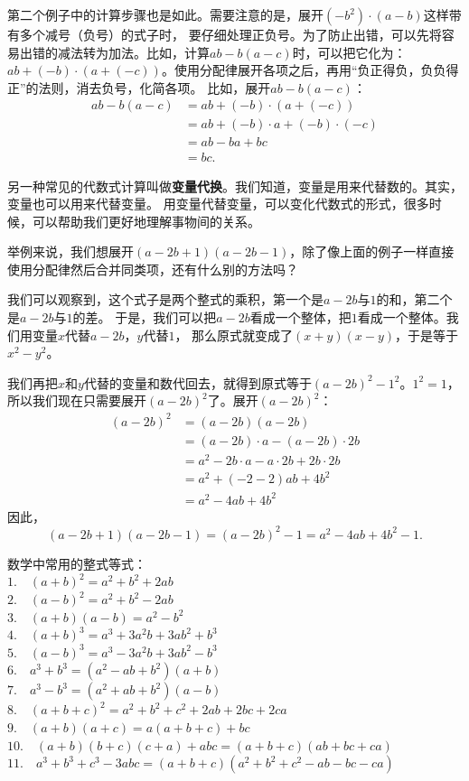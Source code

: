 \documentclass[12pt,UTF8]{ctexbook}
\begin{document}
第二个例子中的计算步骤也是如此。需要注意的是，展开$(- b^2)\cdot (a - b)$这样带有多个减号（负号）的式子时，
要仔细处理正负号。为了防止出错，可以先将容易出错的减法转为加法。比如，计算$ab - b(a-c)$时，可以把它化为：
$ab+(-b)\cdot(a + (-c))$。使用分配律展开各项之后，再用“负正得负，负负得正”的法则，消去负号，化简各项。
比如，展开$ab - b(a-c)$：
\begin{align*}
    ab - b(a-c) &= ab+(-b)\cdot(a + (-c)) \tag{减法化加法}\\
    &= ab + (-b)\cdot a + (-b) \cdot (-c) \tag{分配律展开} \\
    &= ab - ba + bc \tag{消去负号}\\
    &= bc.
\end{align*}

另一种常见的代数式计算叫做\textbf{变量代换}。我们知道，变量是用来代替数的。其实，变量也可以用来代替变量。
用变量代替变量，可以变化代数式的形式，很多时候，可以帮助我们更好地理解事物间的关系。

举例来说，我们想展开$(a - 2b + 1)(a - 2b - 1)$，除了像上面的例子一样直接使用分配律然后合并同类项，还有什么别的方法吗？

我们可以观察到，这个式子是两个整式的乘积，第一个是$a - 2b$与$1$的和，第二个是$a - 2b$与$1$的差。
于是，我们可以把$a - 2b$看成一个整体，把$1$看成一个整体。我们用变量$x$代替$a - 2b$，$y$代替$1$，
那么原式就变成了$(x + y)(x - y)$，于是等于$x^2 - y^2$。

我们再把$x$和$y$代替的变量和数代回去，就得到原式等于$(a - 2b)^2 - 1^2$。$1^2 = 1$，
所以我们现在只需要展开$(a - 2b)^2$了。展开$(a - 2b)^2$：
\begin{align*}
    (a - 2b)^2 &= (a - 2b)(a - 2b)  \\
    &= (a - 2b)\cdot a - (a - 2b) \cdot 2b  \\
    &= a^2 -2b\cdot a -a\cdot 2b + 2b\cdot 2b  \\
    &= a^2 + (-2 -2) ab + 4b^2  \\
    &= a^2 - 4ab + 4b^2 
\end{align*}
因此，
$$ (a - 2b + 1)(a - 2b - 1) = (a - 2b)^2 - 1 = a^2 - 4ab + 4b^2 - 1.$$

数学中常用的整式等式：\\
\indent $1. \quad (a + b)^2 = a^2 + b^2 + 2ab $ \\
\indent $2. \quad (a - b)^2 = a^2 + b^2 - 2ab $ \\
\indent $3. \quad (a + b)(a - b) = a^2 - b^2 $ \\
\indent $4. \quad (a + b)^3 = a^3 + 3a^2b + 3ab^2 + b^3 $ \\
\indent $5. \quad (a - b)^3 = a^3 - 3a^2b + 3ab^2 - b^3 $ \\
\indent $6. \quad a^3 + b^3 = (a^2 - ab + b^2)(a + b) $ \\
\indent $7. \quad a^3 - b^3 = (a^2 + ab + b^2)(a - b) $ \\
\indent $8. \quad (a + b + c)^2 = a^2 + b^2 + c^2 + 2ab + 2bc + 2ca $ \\
\indent $9. \quad (a + b)(a + c) = a(a + b + c) + bc $ \\
\indent $10. \quad (a + b)(b + c)(c + a) + abc = (a + b + c)(ab + bc + ca) $ \\
\indent $11.\quad  a^3+b^3+c^3 - 3abc = (a + b + c)(a^2+b^2+c^2-ab-bc-ca) $ 
\end{document}
